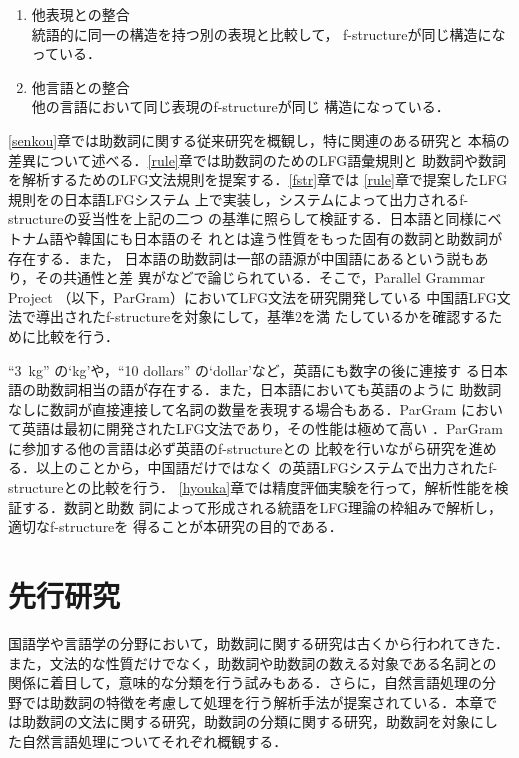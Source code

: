 \documentclass[japanese]{jnlp_1.4}
\begin{document}
\begin{enumerate}
\item{他表現との整合}\\
統語的に同一の構造を持つ別の表現と比較して，
f-structureが同じ構造になっている．
\item{他言語との整合}\\
他の言語において同じ表現のf-structureが同じ
構造になっている．
\end{enumerate}

\ref{senkou}章では助数詞に関する従来研究を概観し，特に関連のある研究と
本稿の差異について述べる．\ref{rule}章では助数詞のためのLFG語彙規則と
助数詞や数詞を解析するためのLFG文法規則を提案する．\ref{fstr}章では
\ref{rule}章で提案したLFG規則を\cite{Masuichi2003}の日本語LFGシステム
上で実装し，システムによって出力されるf-structureの妥当性を上記の二つ
の基準に照らして検証する．日本語と同様にベトナム語や韓国にも日本語のそ
れとは違う性質をもった固有の数詞と助数詞が存在する\cite{yazaki}．また，
日本語の助数詞は一部の語源が中国語にあるという説もあり，その共通性と差
異が\cite{watanabe}などで論じられている．そこで，Parallel Grammar
Project \cite{Butt02}（以下，ParGram）においてLFG文法を研究開発している
中国語LFG文法\cite{ji}で導出されたf-structureを対象にして，基準2を満
たしているかを確認するために比較を行う．

``3~kg'' の`kg'や，``10 dollars'' の`dollar'など，英語にも数字の後に連接す
る日本語の助数詞相当の語が存在する．また，日本語においても英語のように
助数詞なしに数詞が直接連接して名詞の数量を表現する場合もある．ParGram
において英語は最初に開発されたLFG文法であり，その性能は極めて高い
\cite{Riezler}．ParGramに参加する他の言語は必ず英語のf-structureとの
比較を行いながら研究を進める．以上のことから，中国語だけではなく
\cite{Riezler}の英語LFGシステムで出力されたf-structureとの比較を行う．
\ref{hyouka}章では精度評価実験を行って，解析性能を検証する．数詞と助数
詞によって形成される統語をLFG理論の枠組みで解析し，適切なf-structureを
得ることが本研究の目的である．


\section{\label{senkou}先行研究}
国語学や言語学の分野において，助数詞に関する研究は古くから行われてきた．
また，文法的な性質だけでなく，助数詞や助数詞の数える対象である名詞との
関係に着目して，意味的な分類を行う試みもある．さらに，自然言語処理の分
野では助数詞の特徴を考慮して処理を行う解析手法が提案されている．本章で
は助数詞の文法に関する研究，助数詞の分類に関する研究，助数詞を対象にし
た自然言語処理についてそれぞれ概観する．
\end{document}
